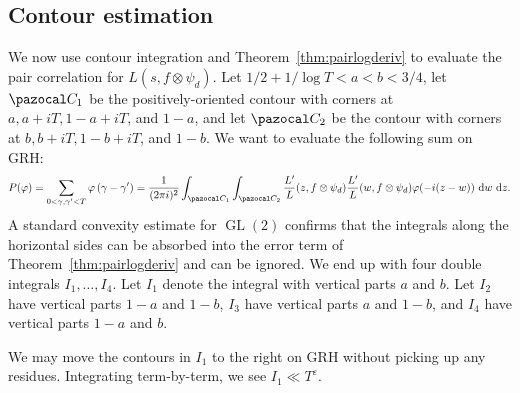 \documentclass[11pt,reqno]{amsart} \usepackage{fullpage}
\newcommand{\vep}{\varepsilon}
\renewcommand{\d}[1]{\,\operatorname*{d}\!{#1}}
\newcommand\be{\begin{equation}}
\newcommand\ee{\end{equation}}
\newcommand{\GL}{\operatorname{GL}}
\numberwithin{equation}{section}
\begin{document}
\subsection{Contour estimation}
We now use contour integration and Theorem~\ref{thm:pairlogderiv} to evaluate the pair
correlation for $L(s,f\otimes\psi_d)$.
Let $1/2+1/\log T<a<b<3/4$, let $\pazocal C_1$ be the positively-oriented contour with
corners at $a,a+iT,1-a+iT$, and $1-a$, and let $\pazocal C_2$ be the contour with corners
at $b,b+iT,1-b+iT$, and $1-b$. We want to evaluate the following sum on GRH:
\be\label{eq:paircorrcontour}
P(\varphi)=\sum_{0<\gamma,\gamma'<T}\varphi\left(\gamma-\gamma'\right)=\frac1{(2\pi i)^2}
\int_{\pazocal C_1}\int_{\pazocal C_2}\frac{L'}{L}(z,f\otimes\psi_d)
\frac{L'}{L}(w,f\otimes\psi_d)\varphi(-i(z-w))\d w\d z.\ee
A standard convexity estimate for $\GL(2)$ confirms that the integrals along the horizontal
sides can be absorbed into the error term of Theorem~\ref{thm:pairlogderiv} and can be
ignored.
We end up with four double integrals $I_1,\ldots,I_4$.
Let $I_1$ denote the integral with vertical parts $a$ and $b$.
Let $I_2$ have vertical parts $1-a$ and $1-b$, $I_3$ have vertical parts $a$ and $1-b$,
and $I_4$ have vertical parts $1-a$ and $b$.

We may move the contours in $I_1$ to the right on GRH without picking up any residues.
Integrating term-by-term, we see $I_1\ll T^\vep$.
\end{document}
